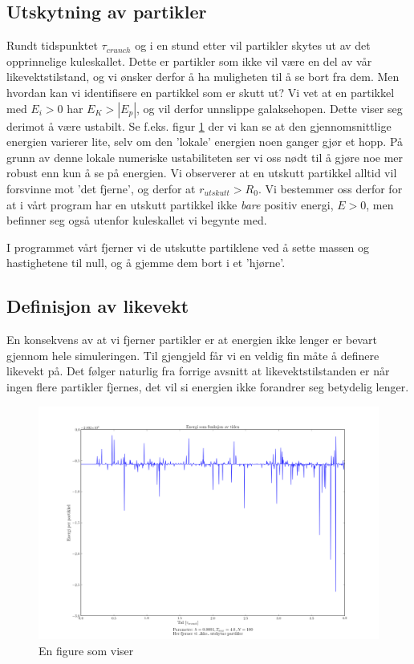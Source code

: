 \documentclass[11pt]{article}
\begin{document}
\begin{multicols}{2}
\subsection{Utskytning av partikler}
Rundt tidspunktet $\tau_{crunch}$ og i en stund etter vil partikler skytes ut
av det opprinnelige kuleskallet. Dette er partikler som ikke vil
være en del av vår likevektstilstand, og vi ønsker derfor å ha muligheten
til å se bort fra dem. Men hvordan kan vi identifisere en partikkel
som er skutt ut? Vi vet at en partikkel med $E_i > 0$ har $E_K > |E_p|$, og
vil derfor unnslippe galaksehopen. Dette viser seg derimot å være ustabilt. Se
f.eks. figur \ref{fig:energivariasjon} der vi kan se at den gjennomsnittlige
energien varierer lite, selv om den 'lokale' energien noen ganger gjør et hopp.
 På grunn av denne lokale numeriske ustabiliteten ser vi oss nødt til å gjøre
noe mer robust enn kun å se på energien. Vi observerer at en utskutt 
partikkel alltid vil forsvinne mot 'det fjerne', og derfor at 
$r_{utskutt} > R_0$. Vi bestemmer oss derfor for at i vårt program har
en utskutt partikkel ikke \emph{bare} positiv energi, $E > 0$, men befinner seg også
utenfor kuleskallet vi begynte med. 

I programmet vårt fjerner vi de utskutte
partiklene ved å sette massen og hastighetene til null, og å gjemme dem bort i et 'hjørne'. 


\subsection{Definisjon av likevekt}
En konsekvens av at vi fjerner partikler er at energien ikke lenger er bevart
gjennom hele simuleringen. Til gjengjeld får vi en veldig fin måte å definere
likevekt på. Det følger naturlig fra forrige avsnitt at likevektstilstanden
er når ingen flere partikler fjernes, det vil si energien ikke forandrer seg
betydelig lenger.

\end{multicols}
\begin{figure}[!ht]
  \centering
  \includegraphics[width=\textwidth]{../fig/energivariasjon.png}
  \caption{\label{fig:energivariasjon} En figure som viser  }
\end{figure}
\end{document}
